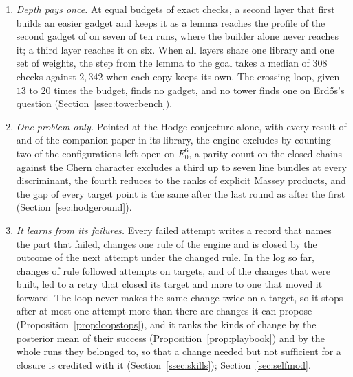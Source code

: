 \begin{enumerate}[label=(\roman*),leftmargin=1.8em,itemsep=1pt]
\item \emph{Depth pays once.} At equal budgets of exact checks, a second layer that first builds an easier gadget and keeps it as a lemma reaches the profile of the second gadget of \cite{CHK17} on seven of ten runs, where the builder alone never reaches it; a third layer reaches it on six. When all layers share one library and one set of weights, the step from the lemma to the goal takes a median of $308$ checks against $2{,}342$ when each copy keeps its own. The crossing loop, given $13$ to $20$ times the budget, finds no gadget, and no tower finds one on Erd\H{o}s's question (Section~\ref{ssec:towerbench}).
\item \emph{One problem only.} Pointed at the Hodge conjecture alone, with every result of \cite{BB26c} and of the companion paper \cite{BMB26b} in its library, the engine excludes by counting two of the configurations left open on $E_{0}^{6}$, a parity count on the closed chains against the Chern character excludes a third up to seven line bundles at every discriminant, the fourth reduces to the ranks of explicit Massey products, and the gap of every target point is the same after the last round as after the first (Section~\ref{sec:hodgeround}).
\item \emph{It learns from its failures.} Every failed attempt writes a record that names the part that failed, changes one rule of the engine and is closed by the outcome of the next attempt under the changed rule. In the log so far, \modChanges{} changes of rule followed \modAttempts{} attempts on \modTargets{} targets, and of the \modBuilt{} changes that were built, \modRetryClosed{} led to a retry that closed its target and \modRetryPartial{} more to one that moved it forward. The loop never makes the same change twice on a target, so it stops after at most one attempt more than there are changes it can propose (Proposition~\ref{prop:loopstops}), and it ranks the kinds of change by the posterior mean of their success (Proposition~\ref{prop:playbook}) and by the whole runs they belonged to, so that a change needed but not sufficient for a closure is credited with it (Section~\ref{ssec:skills}); Section~\ref{sec:selfmod}.

\end{enumerate}
